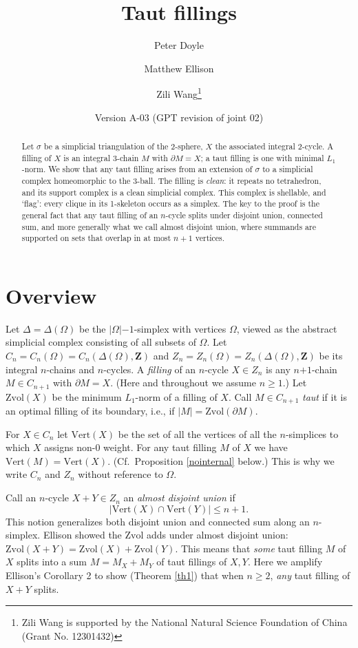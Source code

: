 \documentclass[12pt]{article}
\title{Taut fillings}
\author{Peter Doyle \and Matthew Ellison \and Zili Wang\thanks{
Zili Wang is supported by
the National Natural Science Foundation of China (Grant No. 12301432)
}}
\date{Version A-03 (GPT revision of joint 02)}
\def\ZZ{\mathbf{Z}}
\def\del{\partial}
\newcommand{\kw}{\mathrm}
\newcommand{\vertices}{\kw{Vert}}
\newcommand{\Zvol}{\kw{Zvol}}
\newcommand{\pls}{\mathord{+}}
\newcommand{\mns}{\mathord{-}}
\begin{document}
\maketitle

\begin{abstract}
Let $\sigma$ be a simplicial triangulation of the 2-sphere,
$X$ the associated integral 2-cycle.
A filling of $X$ is an integral 3-chain $M$
with $\del M = X$;
a taut filling is one with minimal $L_1$-norm.
We show that any taut filling 
arises from an extension of $\sigma$ to
a simplicial complex homeomorphic to the 3-ball.
The filling is \emph{clean}: it repeats no tetrahedron, and its support
complex is a clean simplicial complex.
This complex is shellable, and `flag':
every clique in its 1-skeleton occurs as a simplex.
The key to the proof is the general
fact that any taut filling of an $n$-cycle
splits under disjoint union, connected sum, and more generally
what we call almost disjoint union,
where summands are supported on sets that overlap in at most $n+1$ vertices.
\end{abstract}

\section{Overview}
Let $\Delta = \Delta(\Omega)$ be the $|\Omega|\mns 1$-simplex
with vertices $\Omega$,
viewed as the abstract simplicial complex consisting of all subsets of
$\Omega$.
Let $C_n=C_n(\Omega)=C_n(\Delta(\Omega),\ZZ)$
and $Z_n=Z_n(\Omega)=Z_n(\Delta(\Omega),\ZZ)$
be its integral $n$-chains and $n$-cycles.
A \emph{filling} of an $n$-cycle $X \in Z_n$ is any
$n\pls 1$-chain $M \in C_{n+1}$ with $\del M = X$.
(Here and throughout we assume $n\geq 1$.)
Let $\Zvol(X)$ be the minimum $L_1$-norm of a filling of $X$.
Call $M \in C_{n+1}$ \emph{taut} if it is an optimal filling
of its boundary, i.e., if $|M|=\Zvol(\del M)$.

For $X \in C_n$ let
$\vertices(X)$ be the set of all the vertices of all the $n$-simplices
to which $X$ assigns non-$0$ weight.
For any taut filling $M$ of $X$ we have $\vertices(M) = \vertices(X)$.
(Cf.\ Proposition \ref{nointernal} below.)
This is why we write $C_n$ and $Z_n$ without reference to $\Omega$.

Call an $n$-cycle $X+Y \in Z_n$ an \emph{almost disjoint union} if
\[
|\vertices(X) \cap \vertices(Y)| \leq n+1
.
\]
This notion generalizes both disjoint union and connected sum
along an $n$-simplex.
Ellison \cite{ellison:gap}
showed the $\Zvol$ adds under almost disjoint union:
$\Zvol(X+Y) = \Zvol(X) + \Zvol(Y)$.
This means that \emph{some} taut filling $M$ of $X$ splits into a sum
$M=M_X+M_Y$ of taut fillings of $X,Y$.
Here we amplify Ellison's Corollary 2 to show (Theorem \ref{th1})
that when $n \geq 2$, \emph{any} taut filling of $X+Y$ splits.
\end{document}
